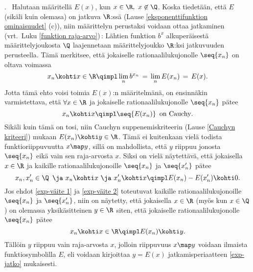. \ Halutaan määritellä $E(x)$, kun $x\in\R,\ x\not\in\Q$. Koska tiedetään,
että $E$ (sikäli kuin olemasa) on jatkuva $\R$:ssä
(Lause \ref{eksponenttifunktion ominaisuudet} (c)), niin määrittelyn perustaksi voidaan ottaa
jatkaminen (vrt.\ Luku \ref{funktion raja-arvo})\,: Lähtien funktion $b^x$ alkuperäisestä
määrittelyjoukosta $\Q$ laajennetaan määrittelyjoukko $\R$:ksi jatkuvuuden perusteella.
Tämä merkitsee, että jokaiselle rationaalilukujonolle $\seq{x_n}$ on oltava voimassa
\begin{equation} \label{exp-jatko}
x_n \kohti x\in\R \qimpl \lim_n b^{x_n} \,=\, \lim_n E(x_n) \,=\, E(x).
\end{equation}
Jotta tämä ehto voisi toimia $E(x)$:n määritelmänä, on ensinnäkin varmistettava, että 
$\forall x\in\R$ ja jokaiselle rationaalilukujonolle $\seq{x_n}$ pätee
\begin{equation} \label{exp-väite 1}
x_n \kohti x \qimpl \text{$\seq{E(x_n)}\,$ on Cauchy}.
\end{equation}
Sikäli kuin tämä on tosi, niin Cauchyn suppenemiskriteerin (Lause \ref{Cauchyn kriteeri})
mukaan $E(x_n) \kohti y\in\R$. Tämä ei kuitenkaan vielä todista funktioriippuvuutta
$x \map y$, sillä on mahdollista, että $y$ riippuu jonosta $\seq{x_n}$ eikä vain sen
raja-arvosta $x$. Siksi on vielä näytettävä, että jokaisella $x\in\R$ ja kaikille
rationaalilukujonoille $\seq{x_n}$ ja $\seq{x_n'}$ pätee
\begin{equation} \label{exp-väite 2}
x_n,x_n'\in\Q\,\ \ja\ x_n \kohti x\ \ja\ x_n' \kohti x \qimpl E(x_n)-E(x_n') \kohti 0.
\end{equation}
Jos ehdot \eqref{exp-väite 1} ja \eqref{exp-väite 2} toteutuvat kaikille
rationaalilukujonoille $\seq{x_n}$ ja $\seq{x_n'}$, niin on näytetty, että jokaisella
$x\in\R$ (myös kun $x\in\Q$) on olemassa yksikäsitteinen $y\in\R$ siten, että jokaiselle
rationaalilukujonolle $\seq{x_n}$ pätee
\[
x_n \kohti x\in\R \qimpl E(x_n) \kohti y.
\]
Tällöin $y$ riippuu vain raja-arvosta $x$, jolloin riippuvuus $x \map y$ voidaan ilmaista
funktiosymbolilla $E$, eli  voidaan kirjoittaa $y=E(x)$ jatkamisperiaatteen \eqref{exp-jatko}
mukaisesti.

